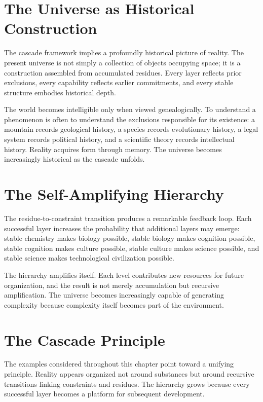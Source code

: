 \documentclass[11pt,oneside]{book}
\theoremstyle{plain}
\theoremstyle{definition}
\theoremstyle{remark}
\begin{document}
\section{The Universe as Historical Construction}

The cascade framework implies a profoundly historical picture of reality. The present universe is not simply a collection of objects occupying space; it is a construction assembled from accumulated residues. Every layer reflects prior exclusions, every capability reflects earlier commitments, and every stable structure embodies historical depth.

The world becomes intelligible only when viewed genealogically. To understand a phenomenon is often to understand the exclusions responsible for its existence: a mountain records geological history, a species records evolutionary history, a legal system records political history, and a scientific theory records intellectual history. Reality acquires form through memory. The universe becomes increasingly historical as the cascade unfolds.

\section{The Self-Amplifying Hierarchy}

The residue-to-constraint transition produces a remarkable feedback loop. Each successful layer increases the probability that additional layers may emerge: stable chemistry makes biology possible, stable biology makes cognition possible, stable cognition makes culture possible, stable culture makes science possible, and stable science makes technological civilization possible.

The hierarchy amplifies itself. Each level contributes new resources for future organization, and the result is not merely accumulation but recursive amplification. The universe becomes increasingly capable of generating complexity because complexity itself becomes part of the environment.

\section{The Cascade Principle}

The examples considered throughout this chapter point toward a unifying principle. Reality appears organized not around substances but around recursive transitions linking constraints and residues. The hierarchy grows because every successful layer becomes a platform for subsequent development.
\end{document}
